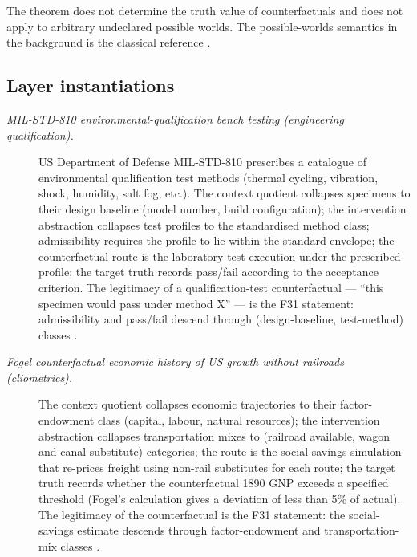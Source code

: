 \documentclass[11pt]{article}
\theoremstyle{definition}
\begin{document}
The theorem does not determine the truth value of counterfactuals and
does not apply to arbitrary undeclared possible worlds.  The
possible-worlds semantics in the background is the classical reference
\citep{Lewis1973Counterfactuals}.

\subsection*{Layer instantiations}\label{layer-inst:F31}

\begin{description}
\item[\emph{{MIL-STD-810} environmental-qualification
bench testing (engineering qualification).}]
US Department of Defense MIL-STD-810 prescribes a
catalogue of environmental qualification test methods
(thermal cycling, vibration, shock, humidity, salt fog,
etc.).  The context quotient collapses specimens to
their design baseline (model number, build
configuration); the intervention abstraction collapses
test profiles to the standardised method class;
admissibility requires the profile to lie within the
standard envelope; the counterfactual route is the
laboratory test execution under the prescribed
profile; the target truth records pass/fail according
to the acceptance criterion.  The legitimacy of a
qualification-test counterfactual --- ``this specimen
would pass under method X'' --- is the F31 statement:
admissibility and pass/fail descend through
(design-baseline, test-method) classes
\citep{MILSTD810H2019}.

\item[\emph{Fogel counterfactual economic history of US
growth without railroads (cliometrics).}]
The context quotient collapses economic trajectories
to their factor-endowment class (capital, labour,
natural resources); the intervention abstraction
collapses transportation mixes to (railroad available,
wagon and canal substitute) categories; the route is
the social-savings simulation that re-prices freight
using non-rail substitutes for each route; the target
truth records whether the counterfactual 1890 GNP
exceeds a specified threshold (Fogel's calculation
gives a deviation of less than 5\% of actual).  The
legitimacy of the counterfactual is the F31 statement:
the social-savings estimate descends through
factor-endowment and transportation-mix classes
\citep{Fogel1964RailroadsAmericanGrowth}.


\end{description}
\end{document}

